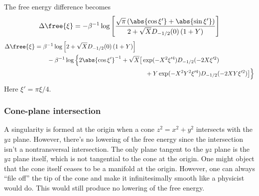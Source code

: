 The free energy difference becomes
%
\begin{equation}
  \Delta\free{\xi} = -\beta^{-1}\log\left[\frac{\sqrt{\pi}\left(\abs{\cos\xi'} + \abs{\sin\xi'}\right)}{2 + \sqrt{X}D_{-1/2}(0)\left(1 + Y\right)}\right]
\end{equation}
\begin{equation}
  \begin{aligned}
    \Delta\free{\xi} &= \beta^{-1}\log\left[2 + \sqrt{X}D_{-1/2}(0)\left(1 + Y\right)\right] \\
                     &\qquad -\beta^{-1}\log\Big\{2\abs{\cos\xi'}^{-1} + \sqrt{X}\big[\exp(-X^{2}\xi'^{4})D_{-1/2}(-2X\xi'^{2})\\
                     & \phantom{\qquad-\beta^{-1}\log\Big\{2\abs{\cos\xi'}^{-1} + \sqrt{X}\big[}
                 \quad+Y\exp(-X^{2}Y^{2}\xi'^{4})D_{-1/2}(-2XY\xi'^{2})\big]\Big\}   \end{aligned}
\end{equation}
%
Here $\xi' = \pi\xi/4$.

\subsubsection*{Cone-plane intersection}

A singularity is formed at the origin when a cone $z^2 = x^2 + y^2$ intersects with the $yz$ plane.
However, there's no lowering of the free energy since the intersection isn't a nontransversal intersection.
The only plane tangent to the $yz$ plane is the $yz$ plane itself, which is not tangential to the cone at the origin.
One might object that the cone itself ceases to be a manifold at the origin.
However, one can always ``file off'' the tip of the cone and make it infinitesimally smooth like a physicist would do.
This would still produce no lowering of the free energy.
